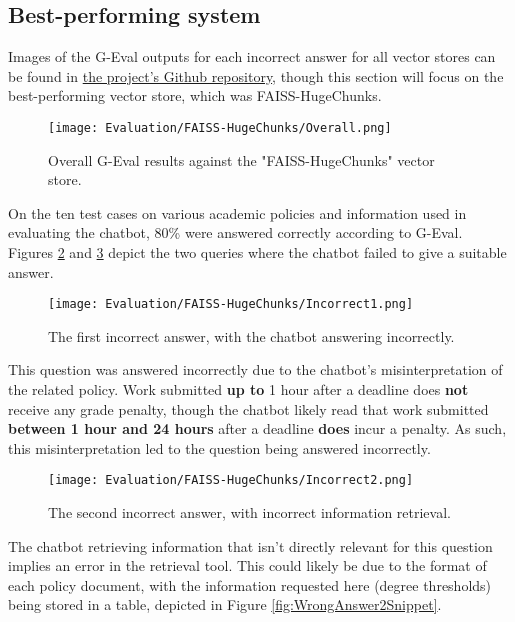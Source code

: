 \subsection{Best-performing system}
\para Images of the G-Eval outputs for each incorrect answer for all vector stores can be found in \href{https://github.com/LewGoesB00M/CMP6200/tree/main/LaTeX/.images/Evaluation}{the project's Github repository}, though this section will focus on the best-performing vector store, which was 
FAISS-HugeChunks.

\begin{figure}[H]
    \centering
    \texttt{[image: Evaluation/FAISS-HugeChunks/Overall.png]}
    \caption{Overall G-Eval results against the "FAISS-HugeChunks" vector store. \label{fig:EvalResults}}
\end{figure}

\noindent On the ten test cases on various academic policies and information used in evaluating the chatbot,
80\% were answered correctly according to G-Eval. Figures \ref{fig:WrongAnswer1} and \ref{fig:WrongAnswer2} depict 
the two queries where the chatbot failed to give a suitable answer.

\begin{figure}[H]
    \centering
    \texttt{[image: Evaluation/FAISS-HugeChunks/Incorrect1.png]}
    \caption{The first incorrect answer, with the chatbot answering incorrectly. \label{fig:WrongAnswer1}}
\end{figure}

\noindent This question was answered incorrectly due to the chatbot's misinterpretation of the related policy. Work submitted \textbf{up to} 
1 hour after a deadline does \textbf{not} receive any grade penalty, though the chatbot likely read that work submitted \textbf{between 1 hour and 
24 hours} after a deadline \textbf{does} incur a penalty. As such, this misinterpretation led to the question being answered incorrectly.

\begin{figure}[H]
    \centering
    \texttt{[image: Evaluation/FAISS-HugeChunks/Incorrect2.png]}
    \caption{The second incorrect answer, with incorrect information retrieval. \label{fig:WrongAnswer2}}
\end{figure}

\noindent The chatbot retrieving information that isn't directly relevant for this question implies an error in the retrieval tool. 
This could likely be due to the format of each policy document, with the information requested here (degree thresholds) being stored in
a table, depicted in Figure \ref{fig:WrongAnswer2Snippet}.

